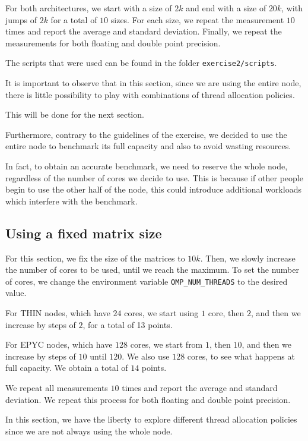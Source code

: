\documentclass{report}
\begin{document}
For both architectures, we start with a size of $2k$ and end with a size of 
$20k$, with jumps of $2k$ for a total of $10$ sizes. For each size, 
we repeat the measurement $10$ times and report the average and standard 
deviation. Finally, we repeat the measurements for both floating and double point precision.

The scripts that were used can be found in the folder \texttt{exercise2/scripts}.

It is important to observe that in this section, since we are using the entire 
node, there is little possibility to play with combinations of thread allocation policies.

This will be done for the next section.

Furthermore, contrary to the guidelines of the exercise, we decided to use the 
entire node to benchmark its full capacity and also to avoid wasting 
resources. 

In fact, to obtain an accurate benchmark, we need to reserve the whole node, 
regardless of the number of cores we decide to use. This is because if other 
people begin to use the other half of the node, this could introduce additional 
workloads which interfere with the benchmark. 

\subsection{Using a fixed matrix size}

For this section, we fix the size of the matrices to $10k$. Then, we slowly 
increase the number of cores to be used, until we reach the maximum. To set the number of cores, we change the environment variable 
\texttt{OMP\_NUM\_THREADS} to the desired value.

For THIN nodes, which have $24$ cores, we start using $1$ core, then $2$, and 
then we increase by steps of $2$, for a total of 13 points.

For EPYC nodes, which have $128$ cores, we start from $1$, then $10$, and then 
we increase by steps of $10$ until $120$. We also use $128$ cores, to see what 
happens at full capacity. We obtain a total of $14$ points.

We repeat all measurements $10$ times and report the average and standard 
deviation. We repeat this process for both floating and double point precision.

In this section, we have the liberty to explore different thread allocation 
policies since we are not always using the whole node. 
\end{document}
